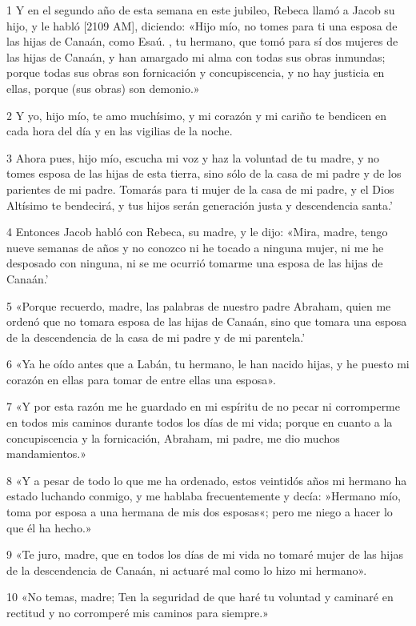 \par 1 Y en el segundo año de esta semana en este jubileo, Rebeca llamó a Jacob su hijo, y le habló [2109 AM], diciendo: «Hijo mío, no tomes para ti una esposa de las hijas de Canaán, como Esaú. , tu hermano, que tomó para sí dos mujeres de las hijas de Canaán, y han amargado mi alma con todas sus obras inmundas; porque todas sus obras son fornicación y concupiscencia, y no hay justicia en ellas, porque (sus obras) son demonio.»
\par 2 Y yo, hijo mío, te amo muchísimo, y mi corazón y mi cariño te bendicen en cada hora del día y en las vigilias de la noche.
\par 3 Ahora pues, hijo mío, escucha mi voz y haz la voluntad de tu madre, y no tomes esposa de las hijas de esta tierra, sino sólo de la casa de mi padre y de los parientes de mi padre. Tomarás para ti mujer de la casa de mi padre, y el Dios Altísimo te bendecirá, y tus hijos serán generación justa y descendencia santa.'
\par 4 Entonces Jacob habló con Rebeca, su madre, y le dijo: «Mira, madre, tengo nueve semanas de años y no conozco ni he tocado a ninguna mujer, ni me he desposado con ninguna, ni se me ocurrió tomarme una esposa de las hijas de Canaán.'
\par 5 «Porque recuerdo, madre, las palabras de nuestro padre Abraham, quien me ordenó que no tomara esposa de las hijas de Canaán, sino que tomara una esposa de la descendencia de la casa de mi padre y de mi parentela.'
\par 6 «Ya he oído antes que a Labán, tu hermano, le han nacido hijas, y he puesto mi corazón en ellas para tomar de entre ellas una esposa».
\par 7 «Y por esta razón me he guardado en mi espíritu de no pecar ni corromperme en todos mis caminos durante todos los días de mi vida; porque en cuanto a la concupiscencia y la fornicación, Abraham, mi padre, me dio muchos mandamientos.»
\par 8 «Y a pesar de todo lo que me ha ordenado, estos veintidós años mi hermano ha estado luchando conmigo, y me hablaba frecuentemente y decía: »Hermano mío, toma por esposa a una hermana de mis dos esposas«; pero me niego a hacer lo que él ha hecho.»
\par 9 «Te juro, madre, que en todos los días de mi vida no tomaré mujer de las hijas de la descendencia de Canaán, ni actuaré mal como lo hizo mi hermano».
\par 10 «No temas, madre; Ten la seguridad de que haré tu voluntad y caminaré en rectitud y no corromperé mis caminos para siempre.»
